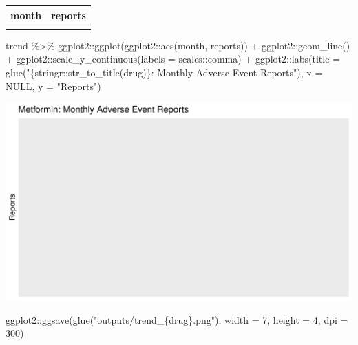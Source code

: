 \documentclass[
  letterpaper,
  DIV=11,
  numbers=noendperiod]{scrartcl}
\newenvironment{Shaded}{\begin{snugshade}}{\end{snugshade}}
\newcommand{\AttributeTok}[1]{\textcolor[rgb]{0.40,0.45,0.13}{#1}}
\newcommand{\ConstantTok}[1]{\textcolor[rgb]{0.56,0.35,0.01}{#1}}
\newcommand{\DecValTok}[1]{\textcolor[rgb]{0.68,0.00,0.00}{#1}}
\newcommand{\FunctionTok}[1]{\textcolor[rgb]{0.28,0.35,0.67}{#1}}
\newcommand{\NormalTok}[1]{\textcolor[rgb]{0.00,0.23,0.31}{#1}}
\newcommand{\SpecialCharTok}[1]{\textcolor[rgb]{0.37,0.37,0.37}{#1}}
\newcommand{\StringTok}[1]{\textcolor[rgb]{0.13,0.47,0.30}{#1}}
\begin{document}
\begin{longtable}[]{@{}lr@{}}
\toprule\noalign{}
month & reports \\
\midrule\noalign{}
\endhead
\bottomrule\noalign{}
\endlastfoot
\end{longtable}

\begin{Shaded}
\begin{Highlighting}[]
\NormalTok{trend }\SpecialCharTok{\%\textgreater{}\%}
\NormalTok{  ggplot2}\SpecialCharTok{::}\FunctionTok{ggplot}\NormalTok{(ggplot2}\SpecialCharTok{::}\FunctionTok{aes}\NormalTok{(month, reports)) }\SpecialCharTok{+}
\NormalTok{  ggplot2}\SpecialCharTok{::}\FunctionTok{geom\_line}\NormalTok{() }\SpecialCharTok{+}
\NormalTok{  ggplot2}\SpecialCharTok{::}\FunctionTok{scale\_y\_continuous}\NormalTok{(}\AttributeTok{labels =}\NormalTok{ scales}\SpecialCharTok{::}\NormalTok{comma) }\SpecialCharTok{+}
\NormalTok{  ggplot2}\SpecialCharTok{::}\FunctionTok{labs}\NormalTok{(}\AttributeTok{title =} \FunctionTok{glue}\NormalTok{(}\StringTok{"\{stringr::str\_to\_title(drug)\}: Monthly Adverse Event Reports"}\NormalTok{),}
       \AttributeTok{x =} \ConstantTok{NULL}\NormalTok{, }\AttributeTok{y =} \StringTok{"Reports"}\NormalTok{)}
\end{Highlighting}
\end{Shaded}

\includegraphics{index_files/figure-pdf/plot-trend-1.pdf}

\begin{Shaded}
\begin{Highlighting}[]
\NormalTok{ggplot2}\SpecialCharTok{::}\FunctionTok{ggsave}\NormalTok{(}\FunctionTok{glue}\NormalTok{(}\StringTok{"outputs/trend\_\{drug\}.png"}\NormalTok{), }\AttributeTok{width =} \DecValTok{7}\NormalTok{, }\AttributeTok{height =} \DecValTok{4}\NormalTok{, }\AttributeTok{dpi =} \DecValTok{300}\NormalTok{)}
\end{Highlighting}
\end{Shaded}
\end{document}
